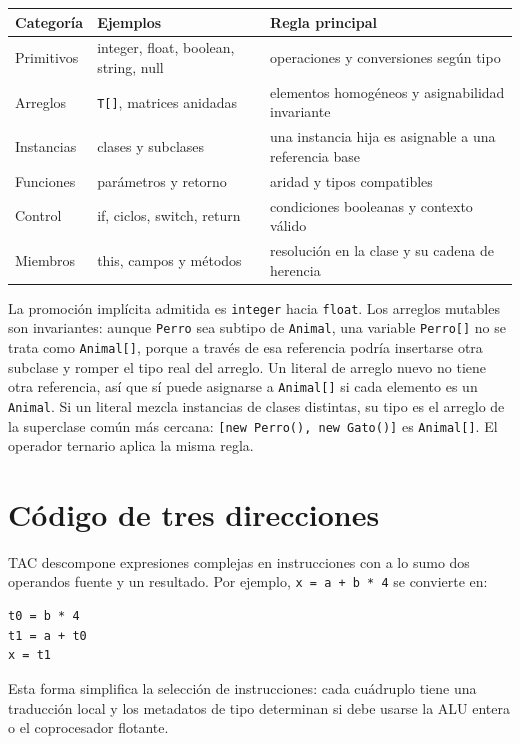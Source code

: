\documentclass[11pt,letterpaper,oneside]{report}
\newcommand{\codigo}[1]{\texttt{#1}}
\begin{document}
\begin{longtable}{p{3.2cm}p{4.1cm}p{5.9cm}}
\toprule
Categor\'ia & Ejemplos & Regla principal\\\midrule
\endhead
Primitivos & integer, float, boolean, string, null & operaciones y conversiones seg\'un tipo\\
Arreglos & \codigo{T[]}, matrices anidadas & elementos homog\'eneos y asignabilidad invariante\\
Instancias & clases y subclases & una instancia hija es asignable a una referencia base\\
Funciones & par\'ametros y retorno & aridad y tipos compatibles\\
Control & if, ciclos, switch, return & condiciones booleanas y contexto v\'alido\\
Miembros & this, campos y m\'etodos & resoluci\'on en la clase y su cadena de herencia\\
\bottomrule
\end{longtable}

La promoci\'on impl\'icita admitida es \codigo{integer} hacia \codigo{float}. Los arreglos mutables son invariantes: aunque \codigo{Perro} sea subtipo de \codigo{Animal}, una variable \codigo{Perro[]} no se trata como \codigo{Animal[]}, porque a trav\'es de esa referencia podr\'ia insertarse otra subclase y romper el tipo real del arreglo. Un literal de arreglo nuevo no tiene otra referencia, as\'i que s\'i puede asignarse a \codigo{Animal[]} si cada elemento es un \codigo{Animal}. Si un literal mezcla instancias de clases distintas, su tipo es el arreglo de la superclase com\'un m\'as cercana: \codigo{[new Perro(), new Gato()]} es \codigo{Animal[]}. El operador ternario aplica la misma regla.

\section{C\'odigo de tres direcciones}

TAC descompone expresiones complejas en instrucciones con a lo sumo dos operandos fuente y un resultado. Por ejemplo, \codigo{x = a + b * 4} se convierte en:

\begin{verbatim}
t0 = b * 4
t1 = a + t0
x = t1
\end{verbatim}

Esta forma simplifica la selecci\'on de instrucciones: cada cu\'adruplo tiene una traducci\'on local y los metadatos de tipo determinan si debe usarse la ALU entera o el coprocesador flotante.
\end{document}
